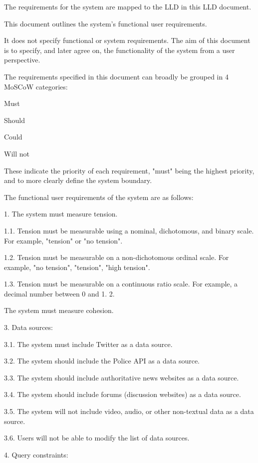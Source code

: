 \begin{DoxyVerb}The requirements for the system are mapped to the LLD in this LLD document.

This document outlines the system's functional user requirements.

It does not specify functional or system requirements.
The aim of this document is to specify, and later agree on, the functionality of the system from a user perspective. 

The requirements specified in this document can broadly be grouped in 4 MoSCoW categories:    

Must     

Should    

Could    

Will not    


These indicate the priority of each requirement, "must" being the highest priority, and to more clearly define the system boundary.    

The functional user requirements of the system are as follows:    

1. The system must measure tension.     

    1.1. Tension must be measurable using a nominal, dichotomous, and binary scale. For example, "tension" or "no tension".    

    1.2. Tension must be measurable on a non-dichotomous ordinal scale. For example, "no tension", "tension", "high tension".       

    1.3. Tension must be measurable on a continuous ratio scale. For example, a decimal number between 0 and 1.
2.    

    The system must measure cohesion.    

3. Data sources:    

    3.1. The system must include Twitter as a data source.    

    3.2. The system should include the Police API as a data source.    

    3.3. The system should include authoritative news websites as a data source.    

    3.4. The system should include forums (discussion websites) as a data source.    

    3.5. The system will not include video, audio, or other non-textual data as a data source.    

    3.6. Users will not be able to modify the list of data sources.    

4. Query constraints:    


\end{DoxyVerb}
